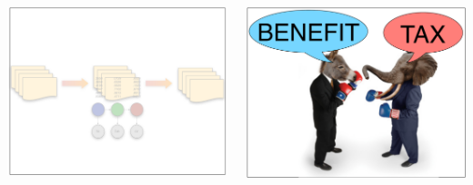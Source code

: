 \documentclass[compress]{beamer}
\begin{document}
\begin{frame}[plain]
  \begin{columns}
    \begin{center}
      \includegraphics[width=\linewidth]{cognitive/algorithms_off}
      \end{center}
    \begin{center}
      \includegraphics[width=\linewidth]{cognitive/framing_on}
      \end{center}
  \end{columns}



\end{frame}
\end{document}
